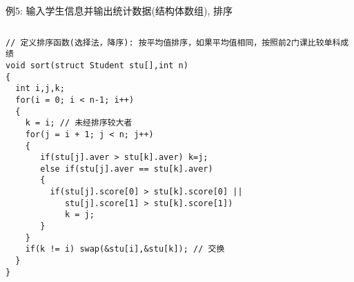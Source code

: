 \begin{frame}{例5: 输入学生信息并输出统计数据(结构体数组), 排序}
\vspace{-0.5cm}
\begin{columns}[T]
\begin{lstlisting}
// 定义排序函数(选择法，降序): 按平均值排序，如果平均值相同，按照前2门课比较单科成绩 
void sort(struct Student stu[],int n)            
{
  int i,j,k;
  for(i = 0; i < n-1; i++) 
  {
    k = i; // 未经排序较大者
    for(j = i + 1; j < n; j++)
    {
       if(stu[j].aver > stu[k].aver) k=j;
       else if(stu[j].aver == stu[k].aver)
       { 
         if(stu[j].score[0] > stu[k].score[0] || 
            stu[j].score[1] > stu[k].score[1])
            k = j; 
       } 
    }
    if(k != i) swap(&stu[i],&stu[k]); // 交换
  } 
}
\end{lstlisting}
\end{columns}
\medskip
\end{frame}

\begin{comment}
\begin{frame}[shrink]
\frametitle{lecture-17 主要内容}
\framesubtitle{建立自己的数据类型}
\tableofcontents
\medskip
\textbf{\textcolor{blue}{训练编程逻辑思维方式:}}
\begin{itemize}
	\item 领会结构化(模块化)编程思想。 
	\item 用结构体管理相互关联的数据, 使其成为结构化的整体数据, 便于统一处理。 
	\item 大问题分解为小问题, 设计函数解决小问题, 各个子函数彼此之间相互独立(便于调试, 不易出错)，又可通过参数和返回值传递数据。
	\item 主程序调用各个子函数, 解决``大"问题。
\end{itemize}
\end{frame}
\end{comment}


